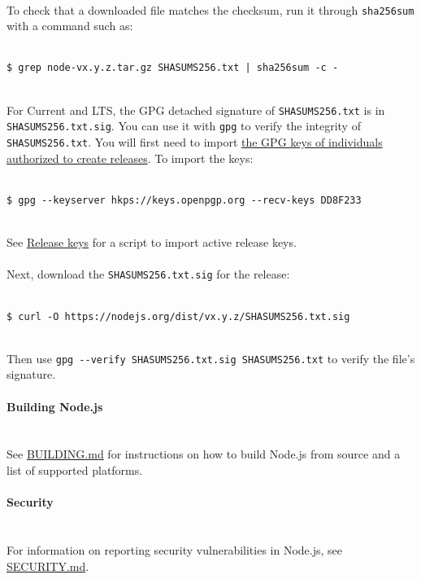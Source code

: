\documentclass{article}
\begin{document}
\\
To check that a downloaded file matches the checksum, run it through \verb|sha256sum| with a command such as:\\
\\
\begin{lstlisting}
$ grep node-vx.y.z.tar.gz SHASUMS256.txt | sha256sum -c -
\end{lstlisting}
\\
For Current and LTS, the GPG detached signature of \verb|SHASUMS256.txt| is in \verb|SHASUMS256.txt.sig|. You can use it with \verb|gpg| to verify the integrity of \verb|SHASUMS256.txt|. You will first need to import \href{#release-keys}{the GPG keys of individuals authorized to create releases}. To import the keys:\\
\\
\begin{lstlisting}
$ gpg --keyserver hkps://keys.openpgp.org --recv-keys DD8F233
\end{lstlisting}
\\
See \href{#release-keys}{Release keys} for a script to import active release keys.\\
\\
Next, download the \verb|SHASUMS256.txt.sig| for the release:\\
\\
\begin{lstlisting}
$ curl -O https://nodejs.org/dist/vx.y.z/SHASUMS256.txt.sig
\end{lstlisting}
\\
Then use \verb|gpg --verify SHASUMS256.txt.sig SHASUMS256.txt| to verify the file's signature.\\
\\
{\noindent \LARGE \textbf{Building Node.js}}\\\\
\\
See \href{BUILDING.md}{BUILDING.md} for instructions on how to build Node.js from source and a list of supported platforms.\\
\\
{\noindent \LARGE \textbf{Security}}\\\\
\\
For information on reporting security vulnerabilities in Node.js, see \href{./SECURITY.md}{SECURITY.md}.\\
\end{document}
